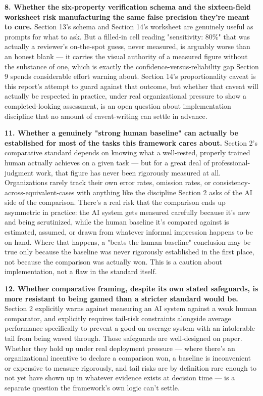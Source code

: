 \textbf{8. Whether the six-property verification schema and the sixteen-field worksheet risk manufacturing the same false precision they're meant to cure.} Section 13's schema and Section 14's worksheet are genuinely useful as prompts for what to ask. But a filled-in cell reading "sensitivity: 80\%" that was actually a reviewer's on-the-spot guess, never measured, is arguably worse than an honest blank --- it carries the visual authority of a measured figure without the substance of one, which is exactly the confidence-versus-reliability gap Section 9 spends considerable effort warning about. Section 14's proportionality caveat is this report's attempt to guard against that outcome, but whether that caveat will actually be respected in practice, under real organizational pressure to show a completed-looking assessment, is an open question about implementation discipline that no amount of caveat-writing can settle in advance.

\textbf{11. Whether a genuinely "strong human baseline" can actually be established for most of the tasks this framework cares about.} Section 2's comparative standard depends on knowing what a well-rested, properly trained human actually achieves on a given task --- but for a great deal of professional-judgment work, that figure has never been rigorously measured at all. Organizations rarely track their own error rates, omission rates, or consistency-across-equivalent-cases with anything like the discipline Section 2 asks of the AI side of the comparison. There's a real risk that the comparison ends up asymmetric in practice: the AI system gets measured carefully because it's new and being scrutinized, while the human baseline it's compared against is estimated, assumed, or drawn from whatever informal impression happens to be on hand. Where that happens, a "beats the human baseline" conclusion may be true only because the baseline was never rigorously established in the first place, not because the comparison was actually won. This is a caution about implementation, not a flaw in the standard itself.

\textbf{12. Whether comparative framing, despite its own stated safeguards, is more resistant to being gamed than a stricter standard would be.} Section 2 explicitly warns against measuring an AI system against a weak human comparator, and explicitly requires tail-risk constraints alongside average performance specifically to prevent a good-on-average system with an intolerable tail from being waved through. Those safeguards are well-designed on paper. Whether they hold up under real deployment pressure --- where there's an organizational incentive to declare a comparison won, a baseline is inconvenient or expensive to measure rigorously, and tail risks are by definition rare enough to not yet have shown up in whatever evidence exists at decision time --- is a separate question the framework's own logic can't settle.
